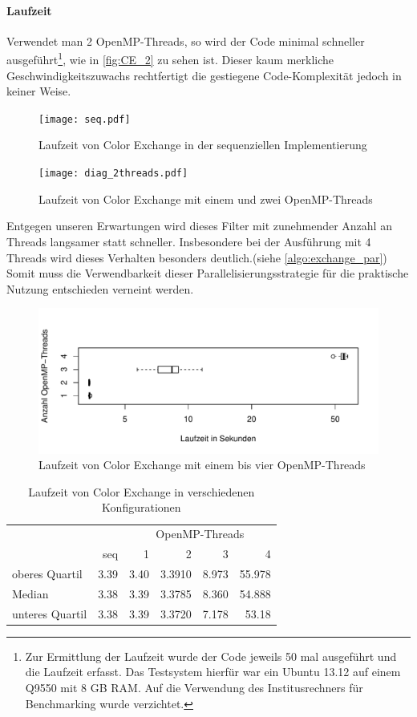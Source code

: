 \documentclass[10pt,a4paper]{article}
\begin{document}
\paragraph{Laufzeit}
Verwendet man 2 OpenMP-Threads, so wird der Code minimal schneller ausgeführt\footnote{Zur Ermittlung der Laufzeit wurde der Code jeweils 50 mal ausgeführt und die Laufzeit erfasst. Das Testsystem hierfür war ein Ubuntu 13.12 auf einem Q9550 mit 8 GB RAM. Auf die Verwendung des Institusrechners für Benchmarking wurde verzichtet.}, wie in \autoref{fig:CE_2} zu sehen ist. Dieser kaum merkliche Geschwindigkeitszuwachs rechtfertigt die gestiegene Code-Komplexität jedoch in keiner Weise.
\begin{figure}[H]
\centering
\texttt{[image: seq.pdf]}
\caption{Laufzeit von Color Exchange in der sequenziellen Implementierung}
\label{fig:CE_seq}
\end{figure}
\begin{figure}[H]
\centering
\texttt{[image: diag\_2threads.pdf]}
\caption{Laufzeit von Color Exchange mit einem und zwei OpenMP-Threads}
\label{fig:CE_2}
\end{figure}
Entgegen unseren Erwartungen wird dieses Filter mit zunehmender Anzahl an Threads langsamer statt schneller. Insbesondere bei der Ausführung mit 4 Threads wird dieses Verhalten besonders deutlich.(siehe \autoref{algo:exchange_par}) Somit muss die Verwendbarkeit dieser Parallelisierungsstrategie für die praktische Nutzung entschieden verneint werden.
\begin{figure}[H]
\centering
\includegraphics[scale=0.7]{diag.pdf}
\caption{Laufzeit von Color Exchange mit einem bis vier OpenMP-Threads}
\end{figure}
\begin{table}[H]
\centering
\begin{tabular}{lrrrrr}
\toprule
 & & \multicolumn{4}{c}{OpenMP-Threads} \\
\cmidrule(r){3-6}
 & seq & 1 & 2 & 3 & 4 \\
oberes Quartil 	& 3.39 		& 3.40 		& 3.3910 		& 8.973 		& 55.978 \\
Median 			& 3.38 		& 3.39 		& 3.3785 		& 8.360 		& 54.888 \\
unteres Quartil 	& 3.38 		& 3.39 		& 3.3720 		& 7.178 		& 53.18 \\
\bottomrule
\end{tabular}
\caption{Laufzeit von Color Exchange in verschiedenen Konfigurationen}
\label{tab:CE_runtime}
\end{table}
\end{document}
